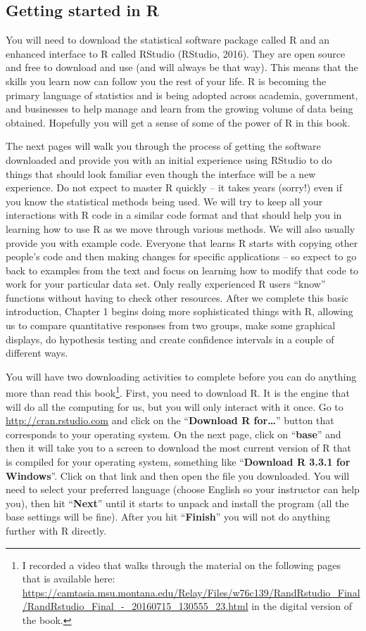 \documentclass[]{article}
\let\rmarkdownfootnote\footnote%
\def\footnote{\protect\rmarkdownfootnote}
\begin{document}
\subsection{Getting started in R}\label{getting-started-in-r}

You will need to download the statistical software package called R and
an enhanced interface to R called RStudio (RStudio, 2016). They are open
source and free to download and use (and will always be that way). This
means that the skills you learn now can follow you the rest of your
life. R is becoming the primary language of statistics and is being
adopted across academia, government, and businesses to help manage and
learn from the growing volume of data being obtained. Hopefully you will
get a sense of some of the power of R in this book.

The next pages will walk you through the process of getting the software
downloaded and provide you with an initial experience using RStudio to
do things that should look familiar even though the interface will be a
new experience. Do not expect to master R quickly -- it takes years
(sorry!) even if you know the statistical methods being used. We will
try to keep all your interactions with R code in a similar code format
and that should help you in learning how to use R as we move through
various methods. We will also usually provide you with example code.
Everyone that learns R starts with copying other people's code and then
making changes for specific applications -- so expect to go back to
examples from the text and focus on learning how to modify that code to
work for your particular data set. Only really experienced R users
``know'' functions without having to check other resources. After we
complete this basic introduction, Chapter 1 begins doing more
sophisticated things with R, allowing us to compare quantitative
responses from two groups, make some graphical displays, do hypothesis
testing and create confidence intervals in a couple of different ways.

You will have two downloading activities to complete before you can do
anything more than read this book\footnote{I recorded a video that walks
  through the material on the following pages that is available here:
  \url{https://camtasia.msu.montana.edu/Relay/Files/w76c139/RandRstudio_Final/RandRstudio_Final_-_20160715_130555_23.html}
  in the digital version of the book.}. First, you need to download R.
It is the engine that will do all the computing for us, but you will
only interact with it once. Go to \url{http://cran.rstudio.com} and
click on the ``\textbf{Download R for\ldots{}}'' button that corresponds
to your operating system. On the next page, click on ``\textbf{base}''
and then it will take you to a screen to download the most current
version of R that is compiled for your operating system, something like
``\textbf{Download R 3.3.1 for Windows}''. Click on that link and then
open the file you downloaded. You will need to select your preferred
language (choose English so your instructor can help you), then hit
``\textbf{Next}'' until it starts to unpack and install the program (all
the base settings will be fine). After you hit ``\textbf{Finish}'' you
will not do anything further with R directly.
\end{document}
